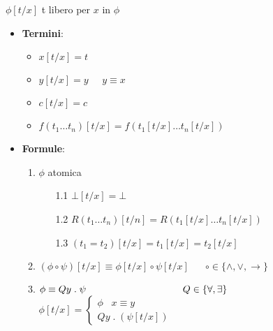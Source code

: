 \documentclass{article}
\theoremstyle{break}
\theoremstyle{break}
\theoremstyle{break}
\theoremstyle{break}
\begin{document}
\begin{figure}[H]
  \begin{definition}[Sostituzione]
    \( \phi[t/x] \) t libero per \( x \) in \( \phi \) 
    \begin{itemize}
      \item \textbf{Termini}:
        \begin{itemize}
          \item 
            \(
            x[t/x] = t
            \) 
          \item 
            \(
            y[t/x] = y\;\;\;\;\; y \equiv x
            \) 
          \item 
            \(
            c[t/x] = c
            \) 
          \item 
            \(
            f(t_1 \ldots t_n)[t/x] = f(t_1[t/x] \ldots t_n[t/x])
            \) 
        \end{itemize}
      \item \textbf{Formule}:
        \begin{enumerate}
          \item \( \phi \) atomica
            \begin{enumerate}
              \item[1.1] \(
              \bot[t/x] = \bot
              \) 
            \item[1.2]
              \( R(t_1 \ldots t_n)[t/n] = R(t_1[t/x] \ldots t_n[t/x]) \) 
            \item [1.3]
              \( (t_1 = t_2)[t/x] = t_1[t/x] = t_2[t/x] \)
            \end{enumerate}
          \item \( (\phi \circ \psi)[t/x] \equiv \phi[t/x] \circ \psi[t/x] \;\;\;\;\;\; \circ \in \{\wedge, \vee, \to \} \)
          \item \( \phi \equiv Qy\;.\;\psi \hspace{3.5cm} Q \in \{\forall , \exists \}  \) \\
                \(
                  \phi[t/x] = \begin{cases}
                    \phi\;\;\; x \equiv y\\
                    Qy\;.\;(\psi[t/x])
                  \end{cases}
                \) 
        \end{enumerate}
    \end{itemize}
  \end{definition}
\end{figure}
\end{document}
